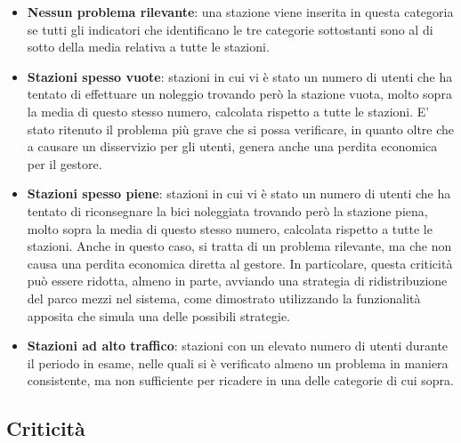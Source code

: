 \documentclass[a4paper, 12pt]{article}
\begin{document}
	\begin{itemize}
		\item \textbf{Nessun problema rilevante}: una stazione viene inserita in questa categoria se tutti gli indicatori che identificano le tre categorie sottostanti sono al di sotto della media relativa a tutte le stazioni.
		\item \textbf{Stazioni spesso vuote}: stazioni in cui vi è stato un numero di utenti che ha tentato di effettuare un noleggio trovando però la stazione vuota, molto sopra la media di questo stesso numero, calcolata rispetto a tutte le stazioni. E' stato ritenuto il problema più grave che si possa verificare, in quanto oltre che a causare un disservizio per gli utenti, genera anche una perdita economica per il gestore.
		\item \textbf{Stazioni spesso piene}: stazioni in cui vi è stato un numero di utenti che ha tentato di riconsegnare la bici noleggiata trovando però la stazione piena, molto sopra la media di questo stesso numero, calcolata rispetto a tutte le stazioni. Anche in questo caso, si tratta di un problema rilevante, ma che non causa una perdita economica diretta al gestore. In particolare, questa criticità può essere ridotta, almeno in parte, avviando una strategia di ridistribuzione del parco mezzi nel sistema, come dimostrato utilizzando la funzionalità apposita che simula una delle possibili strategie.
		\item \textbf{Stazioni ad alto traffico}: stazioni con un elevato numero di utenti durante il periodo in esame, nelle quali si è verificato almeno un problema in maniera consistente, ma non sufficiente per ricadere in una delle categorie di cui sopra.
	\end{itemize}

	\subsection{Criticità}
	\label{crit}
\end{document}
